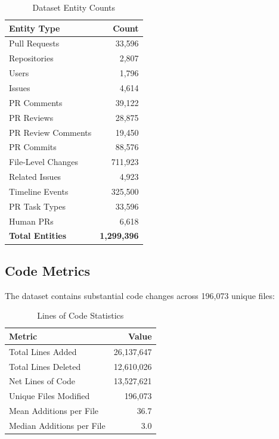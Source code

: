 \documentclass[11pt]{article}
\begin{document}
\begin{table}[H]
\centering
\caption{Dataset Entity Counts}
\label{tab:entity_counts}
\begin{tabular}{@{}lr@{}}
\toprule
\textbf{Entity Type} & \textbf{Count} \\
\midrule
Pull Requests & 33,596 \\
Repositories & 2,807 \\
Users & 1,796 \\
Issues & 4,614 \\
PR Comments & 39,122 \\
PR Reviews & 28,875 \\
PR Review Comments & 19,450 \\
PR Commits & 88,576 \\
File-Level Changes & 711,923 \\
Related Issues & 4,923 \\
Timeline Events & 325,500 \\
PR Task Types & 33,596 \\
Human PRs & 6,618 \\
\midrule
\textbf{Total Entities} & \textbf{1,299,396} \\
\bottomrule
\end{tabular}
\end{table}

\subsection{Code Metrics}

The dataset contains substantial code changes across 196,073 unique files:

\begin{table}[H]
\centering
\caption{Lines of Code Statistics}
\label{tab:loc_stats}
\begin{tabular}{@{}lr@{}}
\toprule
\textbf{Metric} & \textbf{Value} \\
\midrule
Total Lines Added & 26,137,647 \\
Total Lines Deleted & 12,610,026 \\
Net Lines of Code & 13,527,621 \\
Unique Files Modified & 196,073 \\
Mean Additions per File & 36.7 \\
Median Additions per File & 3.0 \\
\bottomrule
\end{tabular}
\end{table}
\end{document}
